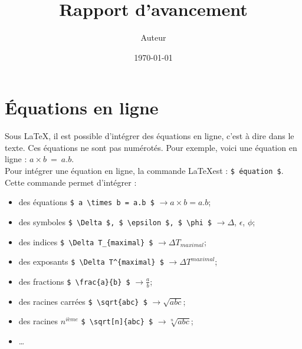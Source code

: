 \documentclass[a4paper,12pt]{report}
\author{Auteur}
\title{Rapport d'avancement}
\date{\today}
\begin{document}
\graphicspath{{Figures/}}




\renewcommand\contentsname{Sommaire}
\setcounter{chapter}{1}
\tableofcontents



\newpage

\section{Équations en ligne}
Sous \LaTeX, il est possible d'intégrer des équations en ligne, c'est à dire dans le texte. Ces équations ne sont pas numérotés. Pour exemple, voici une équation en ligne : $a \times b~=~a.b$. \\

Pour intégrer une équation en ligne, la commande \LaTeX est : \verb|$ équation $|. \\

Cette commande permet d'intégrer :
\begin{itemize}
\item des équations \verb|$ a \times b = a.b $| $ \longrightarrow a \times b = a.b$;
\item des symboles \verb|$ \Delta $, $ \epsilon $, $ \phi $| $ \longrightarrow  \Delta $, $ \epsilon $, $ \phi $;
\item des indices \verb|$ \Delta T_{maximal} $| $ \longrightarrow  \Delta T_{maximal} $;
\item des exposants \verb|$ \Delta T^{maximal} $| $ \longrightarrow  \Delta T^{maximal} $;
\item des fractions \verb|$ \frac{a}{b} $| $ \longrightarrow  \frac{a}{b} $; 
\item des racines carrées \verb|$ \sqrt{abc} $| $ \longrightarrow  \sqrt{abc} $; 
\item des racines $n^{ième}$ \verb|$ \sqrt[n]{abc} $| $ \longrightarrow  \sqrt[n]{abc} $; 
\item \ldots
\end{itemize}
\end{document}
